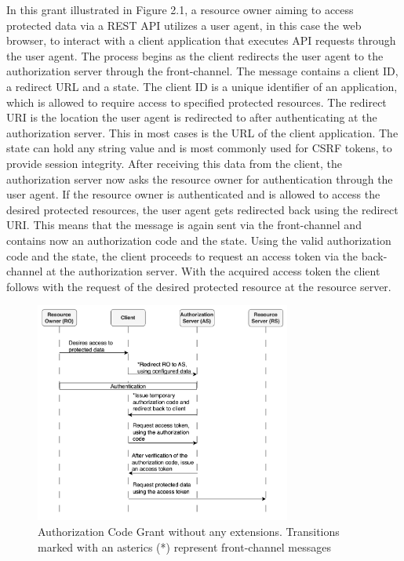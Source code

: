 In this grant illustrated in Figure 2.1, a resource owner aiming to access protected data via a REST API utilizes a user agent, in this case the web browser, to interact with a client application that executes API requests through the user agent. The process begins as the client redirects the user agent to the authorization server through the front-channel. The message contains a client ID, a redirect URL and a state. The client ID is a unique identifier of an application, which is allowed to require access to specified protected resources. The redirect URI is the location the user agent is redirected to after authenticating at the authorization server. This in most cases is the URL of the client application. The state can hold any string value and is most commonly used for CSRF tokens, to provide session integrity. After receiving this data from the client, the authorization server now asks the resource owner for authentication through the user agent. If the resource owner is authenticated and is allowed to access the desired protected resources, the user agent gets redirected back using the redirect URI. This means that the message is again sent via the front-channel and contains now an authorization code and the state. Using the valid authorization code and the state, the client proceeds to request an access token via the back-channel at the authorization server. With the acquired access token the client follows with the request of the desired protected resource at the resource server.

\begin{figure}[H]
	\sffamily\footnotesize
	\includegraphics[width=0.75\textwidth]{pic/authorization_code_grant.png}
	\unitlength=0.75mm
	\linethickness{0.4pt}
	\caption{Authorization Code Grant without any extensions. Transitions marked with an asterics (*) represent front-channel messages}
	\label{fig:auth_code_grant}
\end{figure}

